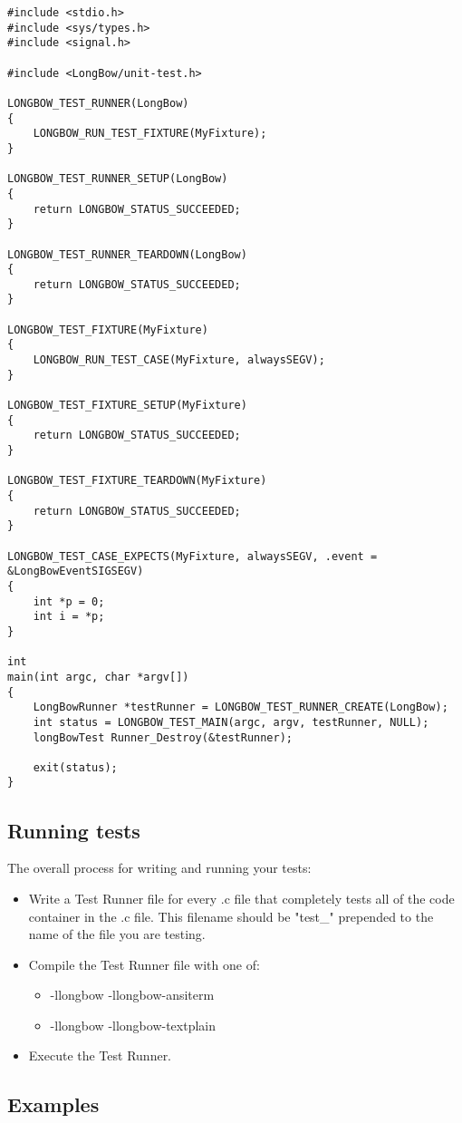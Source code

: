 \documentclass[12pt]{article} %
\begin{document}
\begin{lstlisting}
#include <stdio.h>
#include <sys/types.h>
#include <signal.h>

#include <LongBow/unit-test.h>

LONGBOW_TEST_RUNNER(LongBow)
{
	LONGBOW_RUN_TEST_FIXTURE(MyFixture);
}

LONGBOW_TEST_RUNNER_SETUP(LongBow)
{
	return LONGBOW_STATUS_SUCCEEDED;
}

LONGBOW_TEST_RUNNER_TEARDOWN(LongBow)
{
	return LONGBOW_STATUS_SUCCEEDED;
}

LONGBOW_TEST_FIXTURE(MyFixture)
{
	LONGBOW_RUN_TEST_CASE(MyFixture, alwaysSEGV);
}

LONGBOW_TEST_FIXTURE_SETUP(MyFixture)
{
	return LONGBOW_STATUS_SUCCEEDED;
}

LONGBOW_TEST_FIXTURE_TEARDOWN(MyFixture)
{
	return LONGBOW_STATUS_SUCCEEDED;
}

LONGBOW_TEST_CASE_EXPECTS(MyFixture, alwaysSEGV, .event = &LongBowEventSIGSEGV)
{
	int *p = 0;
	int i = *p;
}

int
main(int argc, char *argv[])
{
	LongBowRunner *testRunner = LONGBOW_TEST_RUNNER_CREATE(LongBow);
	int status = LONGBOW_TEST_MAIN(argc, argv, testRunner, NULL);
	longBowTest Runner_Destroy(&testRunner);

	exit(status);
}

\end{lstlisting}

\subsection{Running tests}  

The overall process for writing and running your tests:
\begin{itemize}
\item  Write a Test Runner file for every .c file that completely tests all of the code container in the .c file. This filename should be "test\_" prepended to the name of the file you are testing.
\item  Compile the Test Runner file with one of:
\begin {itemize}
\item  -llongbow -llongbow-ansiterm
\item  -llongbow -llongbow-textplain
\end{itemize}
\item  Execute the Test Runner.
\end{itemize}


\subsection{Examples }  
\end{document}
